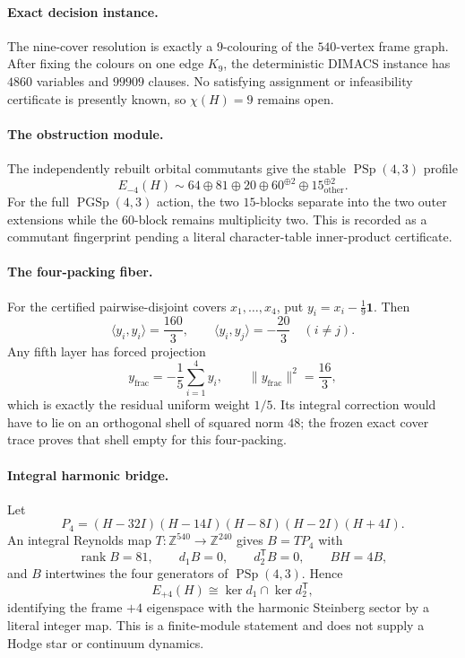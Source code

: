 \begingroup
\makeatletter
{}
\makeatother

\paragraph{Exact decision instance.}
The nine-cover resolution is exactly a $9$-colouring of the $540$-vertex frame
graph. After fixing the colours on one edge $K_9$, the deterministic DIMACS
instance has $4860$ variables and $99909$ clauses. No satisfying assignment or
infeasibility certificate is presently known, so $\chi(H)=9$ remains open.

\paragraph{The obstruction module.}
The independently rebuilt orbital commutants give the stable
$\operatorname{PSp}(4,3)$ profile
\[
 E_{-4}(H)\sim
 64\oplus81\oplus20\oplus60^{\oplus2}
 \oplus15_{\mathrm{other}}^{\oplus2}.
\]
For the full $\operatorname{PGSp}(4,3)$ action, the two $15$-blocks separate into
the two outer extensions while the $60$-block remains multiplicity two. This is
recorded as a commutant fingerprint pending a literal character-table
inner-product certificate.

\paragraph{The four-packing fiber.}
For the certified pairwise-disjoint covers $x_1,\ldots,x_4$, put
$y_i=x_i-\frac19\mathbf1$. Then
\[
 \langle y_i,y_i\rangle=\frac{160}{3},\qquad
 \langle y_i,y_j\rangle=-\frac{20}{3}\quad(i\neq j).
\]
Any fifth layer has forced projection
\[
 y_{\mathrm{frac}}=-\frac15\sum_{i=1}^4y_i,
 \qquad \|y_{\mathrm{frac}}\|^2=\frac{16}{3},
\]
which is exactly the residual uniform weight $1/5$. Its integral correction
would have to lie on an orthogonal shell of squared norm $48$; the frozen exact
cover trace proves that shell empty for this four-packing.

\paragraph{Integral harmonic bridge.}
Let
\[
 P_4=(H-32I)(H-14I)(H-8I)(H-2I)(H+4I).
\]
An integral Reynolds map $T:\mathbb Z^{540}\to\mathbb Z^{240}$ gives
$B=TP_4$ with
\[
 \operatorname{rank}B=81,\qquad d_1B=0,\qquad d_2^{\mathsf T}B=0,
 \qquad BH=4B,
\]
and $B$ intertwines the four generators of $\operatorname{PSp}(4,3)$. Hence
\[
 \boxed{E_{+4}(H)\cong\ker d_1\cap\ker d_2^{\mathsf T}},
\]
identifying the frame $+4$ eigenspace with the harmonic Steinberg sector by a
literal integer map. This is a finite-module statement and does not supply a
Hodge star or continuum dynamics.
\endgroup
